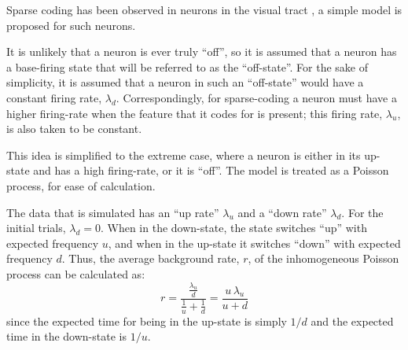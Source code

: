 Sparse coding has been observed in neurons in the visual tract \citep{OlshausenField2004a}, a simple model is proposed for such neurons.

It is unlikely that a neuron is ever truly ``off'', so it is assumed that a neuron has a base-firing state that will be referred to as the ``off-state''.  For the sake of simplicity, it is assumed that a neuron in such an ``off-state'' would have a constant firing rate, $\lambda_d$.  Correspondingly, for sparse-coding a neuron must have a higher firing-rate when the feature that it codes for is present; this firing rate, $\lambda_u$, is also taken to be constant.


This idea is simplified to the extreme case, where a neuron is either in its up-state and has a high firing-rate, or it is ``off''.   The model is treated as a Poisson process, for ease of calculation.


The data that is simulated has an ``up rate'' $\lambda_u$ and a ``down rate'' $\lambda_d$.  For the initial trials, $\lambda_d = 0$.  When in the down-state, the state switches ``up'' with expected frequency $u$, and when in the up-state it switches ``down'' with expected frequency $d$.  Thus, the average background rate, $r$, of the inhomogeneous Poisson process can be calculated as:
\begin{equation}\label{lam}
r = \frac{ \frac{\lambda_u }{d}}{ \frac{1}{u} + \frac{1}{d}} = \frac{u\, \lambda_u}{u+d}
\end{equation}
since the expected time for being in the up-state is simply $1/d$ and the expected time in the down-state is $1/u$.

